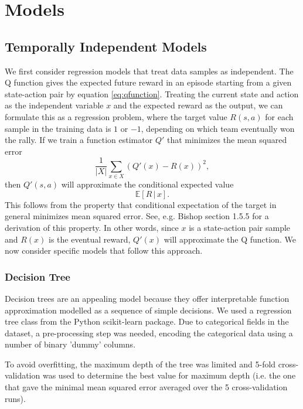 \documentclass{sfuthesis}
\begin{document}
	
	\chapter{Models}
	
	\section{Temporally Independent Models}
	
	We first consider regression models that treat data samples as independent. The Q function gives the expected future reward in an episode starting from a given state-action pair by equation \eqref{eq:qfunction}. Treating the current state and action as the independent variable $x$ and the expected reward as the output, we can formulate this as a regression problem, where the target value $R(s,a)$ for each sample in the training data is $1$ or $-1$, depending on which team eventually won the rally. If we train a function estimator $Q'$ that minimizes the mean squared error
	\begin{equation}
		\frac{1}{|X|}\sum_{x \in X} (Q'(x) - R(x))^2,
		\label{eq:mse}
	\end{equation}
	then $Q'(s,a)$ will approximate the conditional expected value
	$$\mathbb{E} \left[R \, | \, x \right].$$
	This follows from the property that conditional expectation of the target in general minimizes mean squared error. See, e.g. Bishop \cite{bishop2006pattern} section 1.5.5 for a derivation of this property. In other words, since $x$ is a state-action pair sample and $R(x)$ is the eventual reward, $Q'(x)$ will approximate the Q function. We now consider specific models that follow this approach.
	
	\subsection{Decision Tree}
	
	Decision trees are an appealing model because they offer interpretable function approximation modelled as a sequence of simple decisions. We used a regression tree class from the Python scikit-learn package. Due to categorical fields in the dataset, a pre-processing step was needed, encoding the categorical data using a number of binary 'dummy' columns.
	
	To avoid overfitting, the maximum depth of the tree was limited and 5-fold cross-validation was used to determine the best value for maximum depth (i.e. the one that gave the minimal mean squared error averaged over the 5 cross-validation runs). 
	
\end{document}
